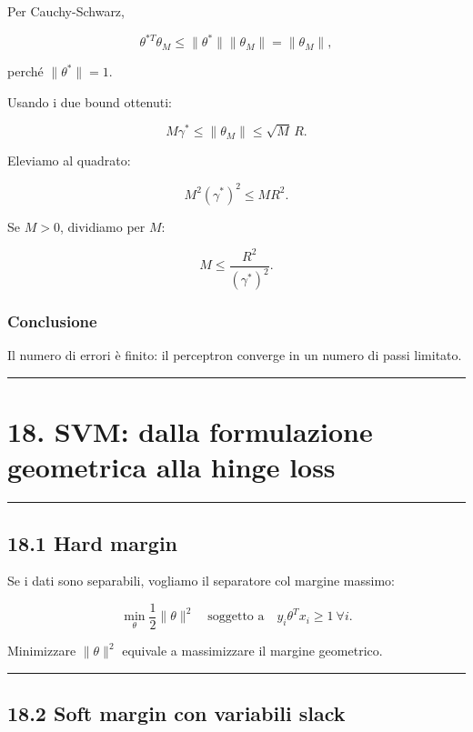 \documentclass[
]{article}
\begin{document}
Per Cauchy-Schwarz,

\[
\theta^{*T}\theta_M \le \|\theta^*\|\|\theta_M\| = \|\theta_M\|,
\]

perché \(\|\theta^*\|=1\).

Usando i due bound ottenuti:

\[
M\gamma^* \le \|\theta_M\| \le \sqrt{M}\,R.
\]

Eleviamo al quadrato:

\[
M^2(\gamma^*)^2 \le M R^2.
\]

Se \(M>0\), dividiamo per \(M\):

\[
M \le \frac{R^2}{(\gamma^*)^2}.
\]

\subsubsection{Conclusione}\label{conclusione-8}

Il numero di errori è finito: il perceptron converge in un numero di
passi limitato.

\begin{center}\rule{0.5\linewidth}{0.5pt}\end{center}

\section{18. SVM: dalla formulazione geometrica alla hinge
loss}\label{svm-dalla-formulazione-geometrica-alla-hinge-loss}

\begin{center}\rule{0.5\linewidth}{0.5pt}\end{center}

\subsection{18.1 Hard margin}\label{hard-margin}

Se i dati sono separabili, vogliamo il separatore col margine massimo:

\[
\min_\theta \frac{1}{2}\|\theta\|^2
\quad\text{soggetto a}\quad
y_i\theta^Tx_i \ge 1 \ \forall i.
\]

Minimizzare \(\|\theta\|^2\) equivale a massimizzare il margine
geometrico.

\begin{center}\rule{0.5\linewidth}{0.5pt}\end{center}

\subsection{18.2 Soft margin con variabili
slack}\label{soft-margin-con-variabili-slack}
\end{document}
